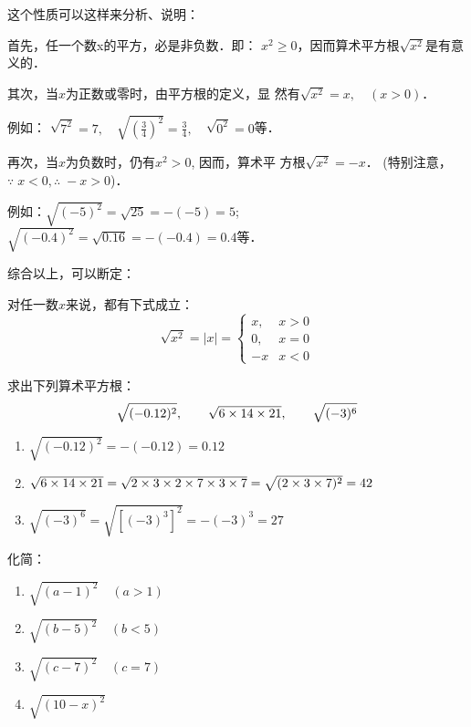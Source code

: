 这个性质可以这样来分析、说明：

首先，任一个数x的平方，必是非负数．即：
$x^2\ge 0$，因而算术平方根$\sqrt{x^2}$是有意义的．

其次，当$x$为正数或零时，由平方根的定义，显
然有$\sqrt{x^2}=x,\quad (x>0)$．

例如：
$\sqrt{7^2}=7,\quad\sqrt{\left(\frac{3}{4}\right)^2}=\frac{3}{4},\quad \sqrt{0^2}=0$等．


再次，当$x$为负数时，仍有$x^2>0$, 因而，算术平
方根$\sqrt{x^2}=-x$． (特别注意，$\because\; x<0, \therefore\; -x>0$)．

例如：$\sqrt{(-5)^2}=\sqrt{25}=-(-5)=5$; 
$\sqrt{(-0.4)^2}=\sqrt{0.16}=-(-0.4)=0.4$等．

综合以上，可以断定：

对任一数$x$来说，都有下式成立：
\[\sqrt{x^2}=|x|=\begin{cases}
    x,& x>0\\
    0, &x=0\\
    -x & x<0
\end{cases}\]


\begin{example}
    求出下列算术平方根：
\[ \sqrt{(-0.12)^2},\qquad \sqrt{6\times 14\times 21},\qquad \sqrt{(-3)^6} \]
\end{example}

\begin{solution}
\begin{enumerate}
    \item $ \sqrt{(-0.12)^2}=-(-0.12)=0.12$
    \item $\sqrt{6\times 14\times 21}=\sqrt{2\times3\times2\times7\times3\times7}=\sqrt{(2\times3\times7)^2}=42$
    \item $\sqrt{(-3)^6}=\sqrt{[(-3)^3]^2}=-(-3)^3=27$
\end{enumerate}
\end{solution}

\begin{example}
    化简：
\begin{multicols}{2}
\begin{enumerate}
    \item $\sqrt{(a-1)^{2}}\quad (a>1)$
    \item $\sqrt{(b-5)^{2}}\quad (b<5)$
    \item $\sqrt{(c-7)^{2}}\quad (c=7)$
    \item $\sqrt{(10-x)^{2}}$
\end{enumerate}
\end{multicols}
\end{example}

